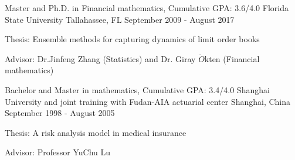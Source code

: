 \begin{cventries}
  \cventry
    {Master and Ph.D. in Financial mathematics, Cumulative GPA: 3.6/4.0}
    {Florida State University}
    {Tallahassee, FL}
    {September 2009 - August 2017}
	{
	\begin{cvitems}
	                \item{Thesis: Ensemble methods for capturing dynamics of limit order books}
	                \item {Advisor: Dr.Jinfeng Zhang (Statistics) and Dr. Giray $\ddot{O}$kten (Financial mathematics)}
	\end{cvitems}	
	}
 	 
 \cventry
     {Bachelor and Master in mathematics, Cumulative GPA: 3.4/4.0}
     {Shanghai University and joint training with Fudan-AIA actuarial center}
     {Shanghai, China}
     {September 1998 - August 2005}
 	{ 	
 	 	\begin{cvitems}
 	 		                \item{Thesis: A risk analysis model in medical insurance}
 	 		                \item {Advisor: Professor YuChu Lu}
 	 		\end{cvitems}
 	}      
\end{cventries}
